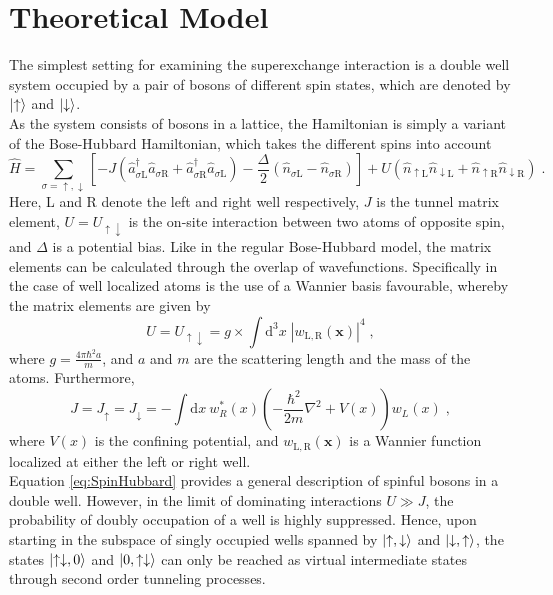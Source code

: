\section{Theoretical Model}
The simplest setting for examining the superexchange interaction is a double well system occupied by a pair of bosons of different spin states, which are denoted by $\ket{\uparrow}$ and $\ket{\downarrow}$.\\
As the system consists of bosons in a lattice, the Hamiltonian is simply a variant of the Bose-Hubbard Hamiltonian, which takes the different spins into account
\begin{equation}
	\hat{H} = \sum_{\sigma = \uparrow , \downarrow} \left[ -J \left( \hat{a}_{\sigma \mathrm{L}}^{\dag} \hat{a}_{\sigma \mathrm{R}} + \hat{a}_{\sigma \mathrm{R}}^{\dag} \hat{a}_{\sigma \mathrm{L}} \right) - \frac{\Delta}{2} \left( \hat{n}_{\sigma \mathrm{L}} - \hat{n}_{\sigma \mathrm{R}} \right)   \right] + U \left( \hat{n}_{\uparrow \mathrm{L}} \hat{n}_{\downarrow \mathrm{L}} + \hat{n}_{\uparrow \mathrm{R}} \hat{n}_{\downarrow \mathrm{R}} \right) \; . \label{eq:SpinHubbard}
\end{equation}
Here, L and R denote the left and right well respectively, $J$ is the tunnel matrix element, $U = U_{\uparrow \downarrow}$ is the on-site interaction between two atoms of opposite spin, and $\Delta$ is a potential bias. Like in the regular Bose-Hubbard model, the matrix elements can be calculated through the overlap of wavefunctions. Specifically in the case of well localized atoms is the use of a Wannier basis favourable, whereby the matrix elements are given by 
\begin{equation}
	U = U_{\uparrow \downarrow} = g \times \int \mathrm{d}^3 x \; |w_{\mathrm{L},\mathrm{R}} (\boldsymbol{x})|^4 \; ,
\end{equation} 
where $g = \frac{4 \pi \hbar^2 a}{m}$, and $a$ and $m$ are the scattering length and the mass of the atoms. Furthermore,
\begin{equation}
	J = J_{\uparrow} = J_{\downarrow} = - \int \mathrm{d}x \ w_{R}^*(x) \left( - \frac{\hbar^2}{2 m} \nabla ^2 + V(x) \right) w_{L}(x) \; ,
\end{equation}
where $V(x)$ is the confining potential, and $w_{\mathrm{L},\mathrm{R}} (\boldsymbol{x})$ is a Wannier function localized at either the left or right well.\\
Equation \eqref{eq:SpinHubbard} provides a general description of spinful bosons in a double well. However, in the limit of dominating interactions $U \gg J$, the probability of doubly occupation of a well is highly suppressed. Hence, upon starting in the subspace of singly occupied wells spanned by $\ket{\uparrow,\downarrow}$ and $\ket{\downarrow,\uparrow}$, the states $\ket{\uparrow \downarrow, 0}$ and $\ket{0, \uparrow \downarrow}$ can only be reached as virtual intermediate states through second order tunneling processes.
